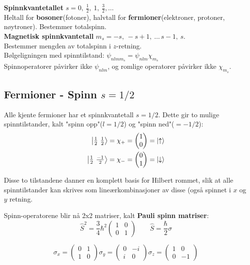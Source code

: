 \documentclass[10p,a4paper]{article}
\begin{document}
\textbf{Spinnkvantetallet} $s = 0,\ \frac{1}{2},\ 1,\ \frac{3}{2},\dots$\\
Heltall for \textbf{bosoner}(fotoner), halvtall for \textbf{fermioner}(elektroner, protoner, nøytroner). Bestemmer totalspinn.
\\

\textbf{Magnetisk spinnkvantetall} $m_s = -s,\  -s+1,\ \dots \, s-1,\ s$.\\
Bestemmer mengden av totalspinn i $z$-retning.
\\

Bølgeligningen med spinntilstand: $\psi_{nlmm_s} = \psi_{nlm}\chi_{m_s}$
\\

Spinnoperatorer påvirker ikke $\psi_{nlm}$, og romlige operatorer påvirker ikke $\chi_{m_s}$.

\subsection*{Fermioner - Spinn $s = 1/2$}
Alle kjente fermioner har et spinnkvantetall $s = 1/2$. Dette gir to mulige spinntilstander, kalt "spinn opp"($l=1/2$) og "spinn ned"($=-1/2$):
\begin{align*}
\ket{\tfrac{1}{2}\ \tfrac{1}{2}} = \chi_+ = \begin{pmatrix} 1 \\ 0 \end{pmatrix} = \ket{\uparrow}\\
\ket{\tfrac{1}{2}\ \tfrac{-1}{2}} = \chi_- = \begin{pmatrix} 0 \\ 1 \end{pmatrix} = \ket{\downarrow}
\end{align*}

Disse to tilstandene danner en komplett basis for Hilbert rommet, slik at alle spinntilstander kan skrives som lineærkombinasjoner av disse (også spinnet i $x$ og $y$ retning.

Spinn-operatorene blir nå 2x2 matriser, kalt \textbf{Pauli spinn matriser}:
\begin{equation*}
\hat{S}^2 = \frac{3}{4}\hbar^2
\begin{pmatrix}
1 & 0\\
0 & 1
\end{pmatrix} \quad \quad
\hat{S} = \frac{\hbar}{2}\sigma
\end{equation*}

\begin{equation*}
\sigma_x =
\begin{pmatrix}
0 & 1\\
1 & 0
\end{pmatrix}
\sigma_y =
\begin{pmatrix}
0 & -i\\
i & 0
\end{pmatrix}
\sigma_z =
\begin{pmatrix}
1 & 0\\
0 & -1
\end{pmatrix}
\end{equation*}
\end{document}
